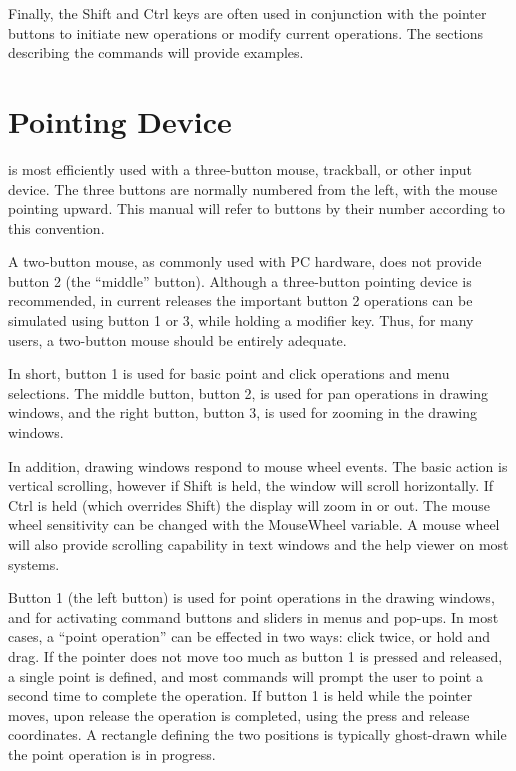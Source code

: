 Finally, the {\kb Shift} and {\kb Ctrl} keys are often used in
conjunction with the pointer buttons to initiate new operations or
modify current operations.  The sections describing the commands will
provide examples.


\section{Pointing Device}
\label{buttons}

{\Xic} is most efficiently used with a three-button mouse, trackball,
or other input device.  The three buttons are normally numbered from
the left, with the mouse pointing upward.  This manual will refer to
buttons by their number according to this convention.

A two-button mouse, as commonly used with PC hardware, does not
provide button 2 (the ``middle'' button).  Although a three-button
pointing device is recommended, in current {\Xic} releases the
important button 2 operations can be simulated using button 1 or 3,
while holding a modifier key.  Thus, for many users, a two-button
mouse should be entirely adequate.

In short, button 1 is used for basic point and click operations and
menu selections.  The middle button, button 2, is used for pan
operations in drawing windows, and the right button, button 3, is used
for zooming in the drawing windows.

In addition, drawing windows respond to mouse wheel events.  The basic
action is vertical scrolling, however if {\kb Shift} is held, the
window will scroll horizontally.  If {\kb Ctrl} is held (which
overrides {\kb Shift}) the display will zoom in or out.  The mouse
wheel sensitivity can be changed with the {\et MouseWheel} variable. 
A mouse wheel will also provide scrolling capability in text windows
and the help viewer on most systems.


Button 1 (the left button) is used for point operations in the drawing
windows, and for activating command buttons and sliders in menus and
pop-ups.  In most cases, a ``point operation'' can be effected in two
ways: click twice, or hold and drag.  If the pointer does not move too
much as button 1 is pressed and released, a single point is defined,
and most commands will prompt the user to point a second time to
complete the operation.  If button 1 is held while the pointer moves,
upon release the operation is completed, using the press and release
coordinates.  A rectangle defining the two positions is typically
ghost-drawn while the point operation is in progress.

